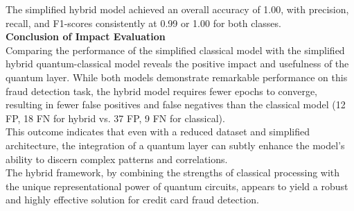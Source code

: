 \documentclass[10pt]{article}
\begin{document}
The simplified hybrid model achieved an overall accuracy of 1.00, with precision, recall, and F1-scores consistently at 0.99 or 1.00 for both classes. \\

\noindent \textbf{Conclusion of Impact Evaluation} \\
Comparing the performance of the simplified classical model with the simplified hybrid quantum-classical model reveals the positive impact and usefulness of the quantum layer. While both models demonstrate remarkable performance on this fraud detection task, the hybrid model requires fewer epochs to converge, resulting in fewer false positives and false negatives than the classical model (12 FP, 18 FN for hybrid vs. 37 FP, 9 FN for classical). \\
This outcome indicates that even with a reduced dataset and simplified architecture, the integration of a quantum layer can subtly enhance the model's ability to discern complex patterns and correlations.\\
The hybrid framework, by combining the strengths of classical processing with the unique representational power of quantum circuits, appears to yield a robust and highly effective solution for credit card fraud detection.
\end{document}
